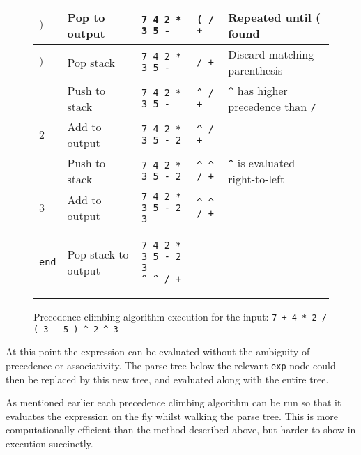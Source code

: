 \documentclass[12pt, letterpaper]{article}
\theoremstyle{definition}
\begin{document}
\begin{figure}[H]
\begin{center}
\begin{tabular}{| m{1.2cm} | m{3.1cm} | m{3.6cm} | m{2.3cm} | m{3.5cm} |}
            \hline
            $)$ & Pop to output & \verb|7 4 2 * 3 5 -| & \verb|( / +| & Repeated until ( found\\
            \hline
            $)$ & Pop stack & \verb|7 4 2 * 3 5 -| & \verb|/ +| & Discard matching parenthesis\\
            \hline
            $\hat{}$ & Push to stack & \verb|7 4 2 * 3 5 -| & \verb|^ / +| & \verb|^| has higher precedence than \verb|/|\\
            \hline
            $2$ & Add to output & \verb|7 4 2 * 3 5 - 2| & \verb|^ / +| &\\
            \hline
            $\hat{}$ & Push to stack & \verb|7 4 2 * 3 5 - 2| & \verb|^ ^ / +| & \verb|^| is evaluated right-to-left\\
            \hline
            $3$ & Add to output & \verb|7 4 2 * 3 5 - 2 3| & \verb|^ ^ / +| &\\
            \hline
            \verb|end| & Pop stack to output & \begin{verbatim}
7 4 2 * 3 5 - 2 3
^ ^ / +
            \end{verbatim} & & \\
            \hline
        \end{tabular}
    \cprotect\caption{\label{fig:4.7}Precedence climbing algorithm execution for the input: \verb|7 + 4 * 2 / ( 3 - 5 ) ^ 2 ^ 3|}
    \end{center}
\end{figure}

At this point the expression can be evaluated without the ambiguity of precedence or associativity. The parse tree below the relevant \verb|exp| node could then be replaced by this new tree, and evaluated along with the entire tree.

As mentioned earlier each precedence climbing algorithm can be run so that it evaluates the expression on the fly whilst walking the parse tree. This is more computationally efficient than the method described above, but harder to show in execution succinctly.

\pagebreak

\nocite{*}
\printbibliography

\end{document}
